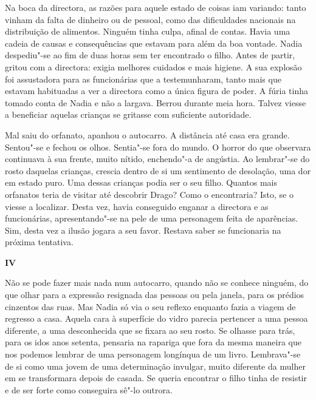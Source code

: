 Na boca da directora, as razões para aquele estado de
coisas iam variando: tanto vinham da falta de dinheiro ou
de pessoal, como das dificuldades nacionais na distribuição de
alimentos. Ninguém tinha culpa, afinal de contas. Havia uma cadeia de
causas e consequências que estavam para além da boa vontade. Nadia
despediu"-se ao fim de duas horas sem ter encontrado o filho. Antes de
partir, gritou com a directora: exigia melhores cuidados e mais higiene.
A sua explosão foi assustadora para as funcionárias que a
testemunharam, tanto mais que estavam habituadas a ver a directora
como a única figura de poder. A fúria tinha tomado conta de Nadia e não
a largava. Berrou durante meia hora. Talvez viesse a beneficiar aquelas crianças se gritasse com suficiente autoridade.

Mal saiu do orfanato, apanhou o autocarro. A distância até casa era
grande. Sentou"-se e fechou os olhos. Sentia"-se fora do mundo. O horror
do que observara continuava à sua frente, muito nítido, enchendo"-a de
angústia. Ao lembrar"-se do rosto daquelas crianças, crescia dentro de si
um sentimento de desolação, uma dor em estado puro. Uma dessas crianças
podia ser o seu filho. Quantos mais orfanatos teria de visitar até
descobrir Drago? Como o encontraria? Isto, se o viesse a localizar.
Desta vez, havia conseguido enganar a directora e as funcionárias,
apresentando"-se na pele de uma personagem feita de aparências. Sim,
desta vez a ilusão jogara a seu favor. Restava saber se funcionaria na
próxima tentativa.

\pagebreak
\thispagestyle{empty}
\movetooddpage
\vspace*{1.8cm}
\noindent{}\textbf{IV}

\bigskip

Não se pode fazer mais nada num autocarro, quando não se conhece
ninguém, do que olhar para a expressão resignada das pessoas ou pela
janela, para os prédios cinzentos das ruas. Mas Nadia só via o seu
reflexo enquanto fazia a viagem de regresso a casa. Aquela cara à
superfície do vidro parecia pertencer a uma pessoa diferente, a uma
desconhecida que se fixara ao seu rosto. Se olhasse para trás, para os
idos anos setenta, pensaria na rapariga que fora da mesma maneira que
nos podemos lembrar de uma personagem longínqua de um livro. Lembrava"-se
de si como uma jovem de uma determinação invulgar, muito diferente da
mulher em se transformara depois de casada. Se queria encontrar o filho
tinha de resistir e de ser forte como conseguira sê"-lo outrora.

